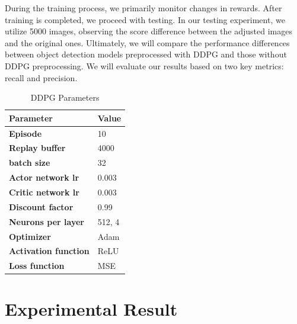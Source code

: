 \documentclass{PHlab-thesis}
\begin{document}
During the training process, we primarily monitor changes in rewards. After training is completed, we proceed with testing. In our testing experiment, we utilize 5000 images, observing the score difference between the adjusted images and the original ones. Ultimately, we will compare the performance differences between object detection models preprocessed with DDPG and those without DDPG preprocessing. We will evaluate our results based on two key metrics: recall and precision.

\begin{table}[H]
	\centering
	\caption{DDPG Parameters}
        \label{Fig.DDPG parameter} 
	\begin{tabular}{p{5cm}p{5cm}}
		\toprule  %
		\textbf{Parameter}   &\textbf{Value}  \\
		\midrule  %
		\textbf{Episode}    & 10 \\
		\textbf{Replay buffer} & 4000   \\
		\textbf{batch size} & 32  \\
		\textbf{Actor network lr} & 0.003  \\
		\textbf{Critic network lr}   & 0.003 \\
		\textbf{Discount factor}   & 0.99 \\
		\textbf{Neurons per layer}   & 512, 4 \\
		\textbf{Optimizer}   & Adam \\
		\textbf{Activation function}   & ReLU \\
		\textbf{Loss function}   & MSE \\
		\bottomrule %
	\end{tabular}
\end{table} 

\section{Experimental Result}
\end{document}
